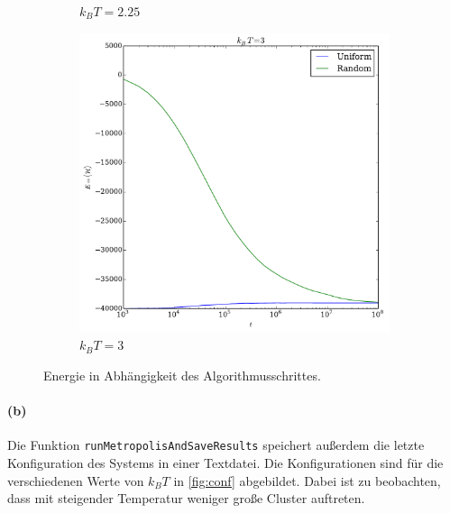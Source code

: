 \documentclass{scrartcl}
\begin{document}
\begin{figure}[H]
\begin{subfigure}{.32\textwidth}
        \caption{$k_BT = 2.25$}
    \end{subfigure}%
    \begin{subfigure}{.32\textwidth}
        \includegraphics[width=\textwidth]{plots/3.pdf}
        \caption{$k_BT = 3$}
    \end{subfigure}
    \caption{Energie in Abhängigkeit des Algorithmusschrittes.}
    \label{fig:equi}
\end{figure}

\paragraph{(b)} Die Funktion \texttt{runMetropolisAndSaveResults} speichert außerdem die letzte Konfiguration des Systems in einer Textdatei. Die Konfigurationen sind für die verschiedenen Werte von $k_BT$ in \autoref{fig:conf} abgebildet. Dabei ist zu beobachten, dass mit steigender Temperatur weniger große Cluster auftreten.
\end{document}
